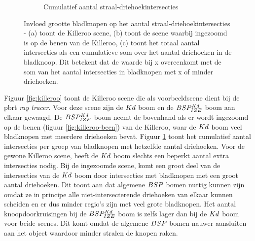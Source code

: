 \begin{figure}
\begin{subfigure}{0.5\textwidth}
        \caption{Cumulatief aantal straal-driehoekintersecties}
        \label{fig:voorbeeld-cumul}
    \end{subfigure}
    \label{fig:voorbeeld-bladknopen}
    \caption[Invloed grootte bladknopen op het aantal straal-driehoekintersecties]{Invloed grootte bladknopen op het aantal straal-driehoekintersecties - \small (a) toont de Killeroo scene, (b) toont de scene waarbij ingezoomd is op de benen van de Killeroo, (c) toont het totaal aantal intersecties als een cumulatieve som over het aantal driehoeken in de bladknoop. Dit betekent dat de waarde bij x overeenkomt met de som van het aantal intersecties in bladknopen met x of minder driehoeken.}
\end{figure}
Figuur \ref{fig:killeroo} toont de Killeroo scene die als voorbeeldscene dient bij de pbrt \cite{pbrt} \textit{ray tracer}.
Voor deze scene zijn de $Kd$ boom en de $BSP^{Kd}_{IZE}$ boom aan elkaar gewaagd.
De $BSP^{Kd}_{IZE}$ boom neemt de bovenhand als er wordt ingezoomd op de benen (figuur \ref{fig:killeroo-been}) van de Killeroo, waar de $Kd$ boom veel bladknopen met meerdere driehoeken bevat.
Figuur \ref{fig:voorbeeld-cumul} toont het cumulatief aantal intersecties per groep van bladknopen met hetzelfde aantal driehoeken.
Voor de gewone Killeroo scene, heeft de $Kd$ boom slechts een beperkt aantal extra intersecties nodig.
Bij de ingezoomde scene, komt een groot deel van de intersecties van de $Kd$ boom door intersecties met bladknopen met een groot aantal driehoeken.
Dit toont aan dat algemene $BSP$ bomen nuttig kunnen zijn omdat ze in principe alle niet-intersecterende driehoeken van elkaar kunnen scheiden en er dus minder regio's zijn met veel grote bladknopen.
Het aantal knoopdoorkruisingen bij de $BSP^{Kd}_{IZE}$ boom is zelfs lager dan bij de $Kd$ boom voor beide scenes.
Dit komt omdat de algemene $BSP$ bomen nauwer aansluiten aan het object waardoor minder stralen de knopen raken.\\


